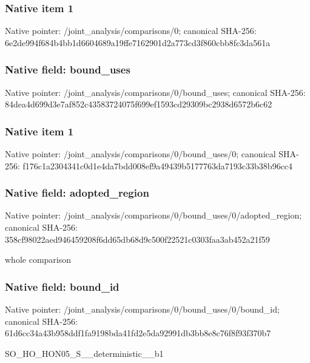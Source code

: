 \documentclass[10pt,a4paper]{article}
\begin{document}
\subsubsection{Native item 1}
Native pointer: /joint\_\allowbreak{}analysis/comparisons/0; canonical SHA-256: 6e2de994f684b4bb1d6604689a19ffe7162901d2a773cd3f860cbb8fc3da561a

\subsubsection{Native field: bound\_\allowbreak{}uses}
Native pointer: /joint\_\allowbreak{}analysis/comparisons/0/bound\_\allowbreak{}uses; canonical SHA-256: 84dea4d699d3e7af852c43583724075f699ef1593cd29309bc2938d6572b6c62

\subsubsection{Native item 1}
Native pointer: /joint\_\allowbreak{}analysis/comparisons/0/bound\_\allowbreak{}uses/0; canonical SHA-256: f176c1a2304341c0d1e4da7bdd008ef9a49439b5177763da7193c33b38b96cc4

\subsubsection{Native field: adopted\_\allowbreak{}region}
Native pointer: /joint\_\allowbreak{}analysis/comparisons/0/bound\_\allowbreak{}uses/0/adopted\_\allowbreak{}region; canonical SHA-256: 358cf98022aed946459208f6dd65db68d9c500f22521c0303faa3ab452a21f59

\begingroup\raggedright\sloppy whole comparison\par\endgroup

\subsubsection{Native field: bound\_\allowbreak{}id}
Native pointer: /joint\_\allowbreak{}analysis/comparisons/0/bound\_\allowbreak{}uses/0/bound\_\allowbreak{}id; canonical SHA-256: 61d6cc34a43b958ddf1fa9198bda41fd2e5da92991db3bb8e8c76f8f93f370b7

\begingroup\raggedright\sloppy SO\_\allowbreak{}HO\_\allowbreak{}HON05\_\allowbreak{}S\_\allowbreak{}\_\allowbreak{}deterministic\_\allowbreak{}\_\allowbreak{}b1\par\endgroup
\end{document}

